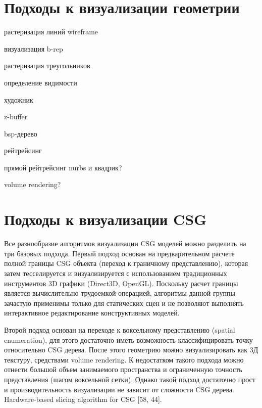 \section{Подходы к визуализации геометрии} \label{sect_geom_vis}


растеризация линий
wireframe

визуализация b-rep

растеризация треугольников

определение видимости

художник

z-buffer

bsp-дерево

рейтрейсинг

прямой рейтрейсинг nurbs и квадрик?

volume rendering?

\section{Подходы к визуализации CSG} \label{sect_csg_vis}


Все разнообразие алгоритмов визуализации CSG моделей можно разделить на три базовых подхода. Первый подход основан на предварительном расчете полной границы CSG объекта (переход к граничному представлению), которая затем тесселируется и визуализируется с использованием традиционных инструментов 3D графики (Direct3D, OpenGL). Поскольку расчет границы является  вычислительно трудоемкой операцией, алгоритмы данной группы зачастую применимы только для статических сцен и не позволяют выполнять интерактивное редактирование конструктивных моделей.

Второй подход основан на переходе к воксельному представлению (spatial enumeration), для этого достаточно иметь возможность классифицировать точку относительно CSG дерева. После этого геометрию можно визуализировать как 3Д текстуру, средствами volume rendering. К недостатком такого подхода можно отнести большой объем занимаемого пространства и ограниченную точность представления (шагом воксельной сетки). Однако такой подход достаточно прост и производительность визуализации не зависит от сложности CSG дерева. Hardware-based slicing algorithm for CSG [58, 44].

